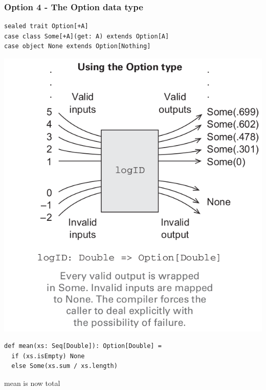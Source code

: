 \documentclass{beamer}
\begin{document}
\begin{frame}[fragile,t]
  \frametitle{Option 4 - The Option data type}
\begin{lstlisting}
sealed trait Option[+A]
case class Some[+A](get: A) extends Option[A]
case object None extends Option[Nothing]
\end{lstlisting}
\begin{center}
\includegraphics[scale=.15]{map-option.png}
\end{center}
\begin{lstlisting}
def mean(xs: Seq[Double]): Option[Double] =
  if (xs.isEmpty) None
  else Some(xs.sum / xs.length)
\end{lstlisting}
{\ttfamily mean} is now total
\end{frame}
\end{document}
